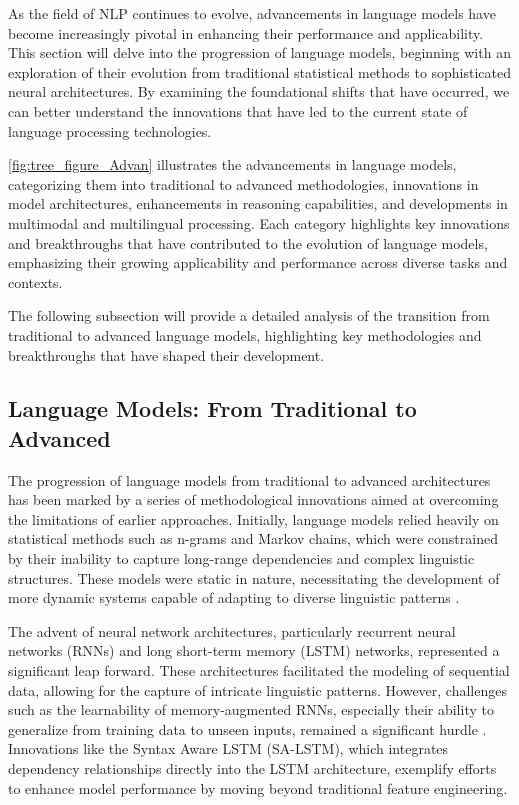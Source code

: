 As the field of NLP continues to evolve, advancements in language models have become increasingly pivotal in enhancing their performance and applicability. This section will delve into the progression of language models, beginning with an exploration of their evolution from traditional statistical methods to sophisticated neural architectures. By examining the foundational shifts that have occurred, we can better understand the innovations that have led to the current state of language processing technologies. 

\autoref{fig:tree_figure_Advan} illustrates the advancements in language models, categorizing them into traditional to advanced methodologies, innovations in model architectures, enhancements in reasoning capabilities, and developments in multimodal and multilingual processing. Each category highlights key innovations and breakthroughs that have contributed to the evolution of language models, emphasizing their growing applicability and performance across diverse tasks and contexts. 

The following subsection will provide a detailed analysis of the transition from traditional to advanced language models, highlighting key methodologies and breakthroughs that have shaped their development.








\subsection{Language Models: From Traditional to Advanced} \label{subsec:Language Models: From Traditional to Advanced}

The progression of language models from traditional to advanced architectures has been marked by a series of methodological innovations aimed at overcoming the limitations of earlier approaches. Initially, language models relied heavily on statistical methods such as n-grams and Markov chains, which were constrained by their inability to capture long-range dependencies and complex linguistic structures. These models were static in nature, necessitating the development of more dynamic systems capable of adapting to diverse linguistic patterns \cite{yamshchikov2020styletransferparaphraselookingsensible}.

The advent of neural network architectures, particularly recurrent neural networks (RNNs) and long short-term memory (LSTM) networks, represented a significant leap forward. These architectures facilitated the modeling of sequential data, allowing for the capture of intricate linguistic patterns. However, challenges such as the learnability of memory-augmented RNNs, especially their ability to generalize from training data to unseen inputs, remained a significant hurdle \cite{lathouwers2017memorypaysdiscordhidden}. Innovations like the Syntax Aware LSTM (SA-LSTM), which integrates dependency relationships directly into the LSTM architecture, exemplify efforts to enhance model performance by moving beyond traditional feature engineering.

